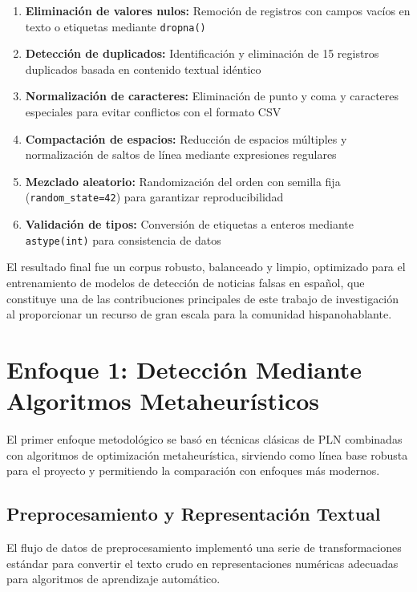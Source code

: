 \begin{enumerate}
    \item \textbf{Eliminación de valores nulos:} Remoción de registros con campos vacíos en texto o etiquetas mediante \texttt{dropna()}
    \item \textbf{Detección de duplicados:} Identificación y eliminación de 15 registros duplicados basada en contenido textual idéntico
    \item \textbf{Normalización de caracteres:} Eliminación de punto y coma y caracteres especiales para evitar conflictos con el formato CSV
    \item \textbf{Compactación de espacios:} Reducción de espacios múltiples y normalización de saltos de línea mediante expresiones regulares
    \item \textbf{Mezclado aleatorio:} Randomización del orden con semilla fija (\texttt{random\_state=42}) para garantizar reproducibilidad
    \item \textbf{Validación de tipos:} Conversión de etiquetas a enteros mediante \texttt{astype(int)} para consistencia de datos
\end{enumerate}

El resultado final fue un corpus robusto, balanceado y limpio, optimizado para el entrenamiento de modelos de detección de noticias falsas en español, que constituye una de las contribuciones principales de este trabajo de investigación al proporcionar un recurso de gran escala para la comunidad hispanohablante.


\section{Enfoque 1: Detección Mediante Algoritmos Metaheurísticos}
\label{sec:enfoque_metaheuristico}

El primer enfoque metodológico se basó en técnicas clásicas de PLN combinadas con algoritmos de optimización metaheurística, sirviendo como línea base robusta para el proyecto y permitiendo la comparación con enfoques más modernos.

\subsection{Preprocesamiento y Representación Textual}

El flujo de datos de preprocesamiento implementó una serie de transformaciones estándar para convertir el texto crudo en representaciones numéricas adecuadas para algoritmos de aprendizaje automático.

